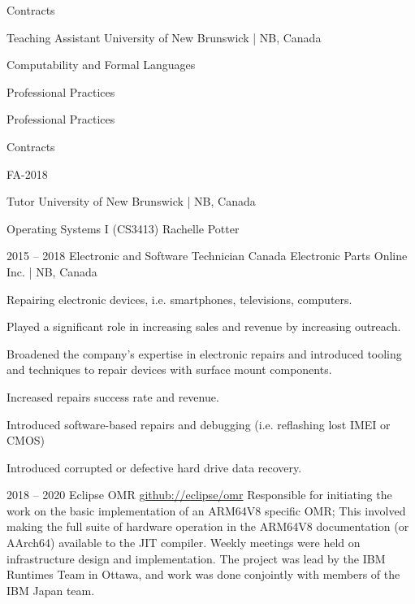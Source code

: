 \documentclass{developercv} %
\begin{document}
\entrys
{
	Contracts\\
	\begin{tightemize}
	\end{tightemize}
}
{Teaching Assistant}
{University of New Brunswick | NB, Canada}
{
	\begin{tightemize}
		\item Computability and Formal Languages
		\item Professional Practices
		\item Professional Practices
	\end{tightemize}
}

\entrys
{
	Contracts\\
	\begin{tightemize}
		\item[] {\footnotesize FA-2018}
	\end{tightemize}
}
{Tutor}
{University of New Brunswick | NB, Canada}
{
	\begin{tightemize}
		\item Operating Systems I (CS3413) Rachelle Potter
	\end{tightemize}
}

\entrys
{2015 -- 2018}
{Electronic and Software Technician}
{Canada Electronic Parts Online Inc. | NB, Canada}{
	Repairing electronic devices, i.e. smartphones, televisions, computers.
	\begin{tightemize}
		\item Played a significant role in increasing sales and revenue by increasing outreach.
		\item Broadened the company's expertise in electronic repairs and introduced tooling and techniques to repair devices with surface mount components.
		\item Increased repairs success rate and revenue.
		\item Introduced software-based repairs and debugging (i.e. reflashing lost IMEI or CMOS)
		\item Introduced corrupted or defective hard drive data recovery.
	\end{tightemize}
}


\entrys
{2018 -- 2020}
{Eclipse OMR}
{\href{https://github.com/eclipse/omr}{github://eclipse/omr}}{
	Responsible for initiating the work on the basic implementation of an ARM64V8 specific OMR; This involved making the full suite of hardware operation in the ARM64V8 documentation (or AArch64) available to the JIT compiler.
	Weekly meetings were held on infrastructure design and implementation.
	The project was lead by the IBM Runtimes Team in Ottawa, and work was done conjointly with members of the IBM Japan team.
}
\end{document}
